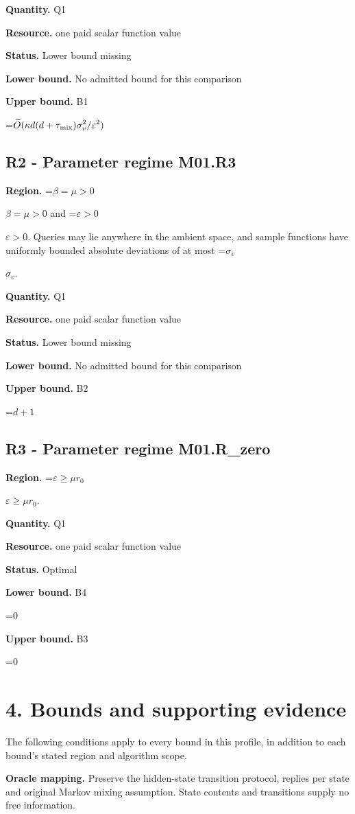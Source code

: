 \documentclass[10pt,a4paper]{article}
\newcommand{\AtlasMath}[1]{\par\begingroup\centering\setbox0=\hbox{$\displaystyle #1$}\ifdim\wd0>1.4\linewidth\typeout{ATLAS WIDE FORMULA: \the\wd0}\fi\ifdim\wd0>\linewidth\resizebox{\linewidth}{!}{\box0}\else\box0\fi\par\endgroup}
\newcommand{\AtlasInlineMath}[1]{\begingroup\setbox0=\hbox{$#1$}\ifdim\wd0>.4\linewidth\endgroup\AtlasMath{#1}\else\endgroup$#1$\fi}
\begin{document}
\textbf{Quantity.} Q1

\textbf{Resource.} one paid scalar function value

\textbf{Status.} Lower bound missing

\textbf{Lower bound.} No admitted bound for this comparison

\textbf{Upper bound.} B1

\AtlasMath{\widetilde{O}(\kappa d(d+\tau_{\rm mix})\sigma_v^2/\varepsilon^2)}
\subsection{R2 - Parameter regime M01.R3}
\textbf{Region.} \AtlasInlineMath{\beta=\mu>0} and \AtlasInlineMath{\varepsilon>0}. Queries may lie anywhere in the ambient space, and sample functions have uniformly bounded absolute deviations of at most \AtlasInlineMath{\sigma_v}.

\textbf{Quantity.} Q1

\textbf{Resource.} one paid scalar function value

\textbf{Status.} Lower bound missing

\textbf{Lower bound.} No admitted bound for this comparison

\textbf{Upper bound.} B2

\AtlasMath{d+1}
\subsection{R3 - Parameter regime M01.R\_zero}
\textbf{Region.} \AtlasInlineMath{\varepsilon\ge\mu r_0}.

\textbf{Quantity.} Q1

\textbf{Resource.} one paid scalar function value

\textbf{Status.} Optimal

\textbf{Lower bound.} B4

\AtlasMath{0}
\textbf{Upper bound.} B3

\AtlasMath{0}
\section{4. Bounds and supporting evidence}
The following conditions apply to every bound in this profile, in addition to each bound's stated region and algorithm scope.

\textbf{Oracle mapping.} Preserve the hidden-state transition protocol, replies per state and original Markov mixing assumption. State contents and transitions supply no free information.
\end{document}
